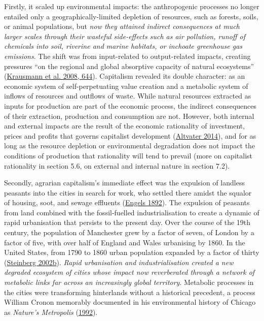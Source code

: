 \documentclass[a4paper, nobind]{templates/ociamthesis}
\begin{document}
Firstly, it scaled up environmental impacts: the anthropogenic processes no longer entailed only a geographically-limited depletion of resources, such as forests, soils, or animal populations, but \emph{now they attained indirect consequences at much larger scales through their wasteful side-effects such as air pollution, runoff of chemicals into soil, riverine and marine habitats, or inchoate greenhouse gas emissions}. The shift was from input-related to output-related impacts, creating pressures ``on the regional and global absorptive capacity of natural ecosystems'' (\protect\hyperlink{ref-krausmann_global_2008}{Krausmann et al. 2008, 644}). Capitalism revealed its double character: as an economic system of self-perpetuating value creation and a metabolic system of inflows of resources and outflows of waste. While natural resources extracted as inputs for production are part of the economic process, the indirect consequences of their extraction, production and consumption are not. However, both internal and external impacts are the result of the economic rationality of investment, prices and profits that governs capitalist development (\protect\hyperlink{ref-altvater_controlling_2014}{Altvater 2014}), and for as long as the resource depletion or environmental degradation does not impact the conditions of production that rationality will tend to prevail (more on capitalist rationality in section 5.6, on external and internal nature in section 7.2).

Secondly, agrarian capitalism's immediate effect was the expulsion of landless peasants into the cities in search for work, who settled there amidst the squalor of housing, soot, and sewage effluents (\protect\hyperlink{ref-engels_condition_1892}{Engels 1892}). The expulsion of peasants from land combined with the fossil-fuelled industrialisation to create a dynamic of rapid urbanisation that persists to the present day. Over the course of the 19th century, the population of Manchester grew by a factor of seven, of London by a factor of five, with over half of England and Wales urbanising by 1860. In the United States, from 1790 to 1860 urban population expanded by a factor of thirty (\protect\hyperlink{ref-steinberg_earth_2002a}{Steinberg 2002b}). \emph{Rapid urbanisation and industrialisation created a new degraded ecosystem of cities whose impact now reverberated through a network of metabolic links far across an increasingly global territory}. Metabolic processes in the cities were transforming hinterlands without a historical precedent, a process William Cronon memorably documented in his environmental history of Chicago as \emph{Nature's Metropolis} (\protect\hyperlink{ref-cronon_natures_1992}{1992}).
\end{document}
